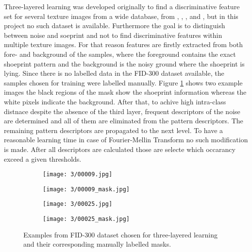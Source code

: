 \documentclass[draft,final]{vutinfth} %
\begin{document}
Three-layered learning was developed originally to find a discriminative feature set for several texture images from a wide database, from \cite{ojala2002outex}, \cite{dana1999reflectance}, \cite{boland2001neural}, \cite{jantzen2005pap} and \cite{brahnam2007introduction}, but in this project no such dataset is available.
Furthermore the goal is to distinguish between noise and soeprint and not to find discriminative features within multiple texture images.
For that reason features are firstly extracted from both fore- and background of the samples, where the foreground contains the exact shoeprint pattern and the background is the noisy ground where the shoeprint is lying.
Since there is no labelled data in the FID-300 \cite{kortylewski2014unsupervised} dataset available, the samples chosen for training were labelled manually.
Figure \ref{fig:pe:mask} shows two example images the black regions of the mask show the shoeprint information whereas the white pixels indicate the background.
After that, to achive high intra-class distnace despite the absence of the third layer, frequent descriptors of the noise are determined and all of them are eliminated from the pattern descriptors.
The remaining pattern descriptors are propagated to the next level. 
To have a reasonable learning time in case of Fourier-Mellin Transform no such modification is made.
After all descriptors are calculated those are selecte which occarancy exceed a given thresholds.

\begin{figure}[h]
  \centering
  \begin{subfigure}[b]{0.24\columnwidth}
    \centering
    \texttt{[image: 3/00009.jpg]}
  \end{subfigure}
  \begin{subfigure}[b]{0.24\columnwidth}
    \centering
    \texttt{[image: 3/00009\_mask.jpg]}
  \end{subfigure}
  \begin{subfigure}[b]{0.24\columnwidth}
    \centering
    \texttt{[image: 3/00025.jpg]}
  \end{subfigure}
  \begin{subfigure}[b]{0.24\columnwidth}
    \centering
    \texttt{[image: 3/00025\_mask.jpg]}
  \end{subfigure}
  \caption{Examples from FID-300 \cite{kortylewski2014unsupervised} dataset chosen for three-layered learning and their corresponding manually labelled masks.}
  \label{fig:pe:mask}
\end{figure}
\end{document}
